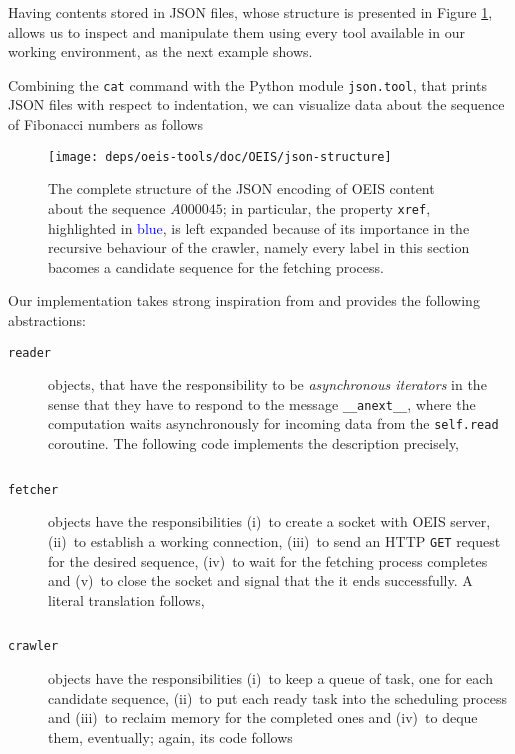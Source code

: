 Having contents stored in JSON files, whose structure is presented in Figure
\ref{fig:json-structure}, allows us to inspect and manipulate them using every
tool available in our working environment, as the next example shows.

\begin{example}
Combining the \verb|cat| command with the Python module \verb|json.tool|, that
prints JSON files with respect to indentation, we can visualize data about the
sequence of Fibonacci numbers as follows
\end{example}

\begin{figure}
\texttt{[image: deps/oeis-tools/doc/OEIS/json-structure]}
\caption{The complete structure of the JSON encoding of OEIS content about the
sequence $A000045$; in particular, the property \texttt{xref}, highlighted in
\textcolor{blue}{blue}, is left expanded because of its importance in the
recursive behaviour of the crawler, namely every label in this section bacomes
a candidate sequence for the fetching process.}
\label{fig:json-structure}
\end{figure}

Our implementation takes strong inspiration from
\citep{VANROSSUM:DAVIS:async:await} and provides the following abstractions:

\begin{description}

\item[\texttt{reader}] objects, that have the responsibility to be
\textit{asynchronous iterators} in the sense that they have to respond to the
message \verb|__anext__|, where the computation waits asynchronously for
incoming data from the \verb|self.read| coroutine. The following code
implements the description precisely,
\inputminted[stripnl=false,firstline=28,lastline=39,baselinestretch=0.8]
{python}{deps/oeis-tools/src/crawling.py} 

\item[\texttt{fetcher}] objects have the responsibilities (i)~to create a socket with
OEIS server, (ii)~to establish a working connection, (iii)~to send an HTTP \verb|GET|
request for the desired sequence, (iv)~to wait for the fetching process completes
and (v)~to close the socket and signal that the it ends successfully.
A literal translation follows,
\inputminted[stripnl=false,firstline=41,lastline=86,baselinestretch=0.8]
    {python}{deps/oeis-tools/src/crawling.py}

\item[\texttt{crawler}] objects have the responsibilities (i)~to keep a queue of task,
one for each candidate sequence, (ii)~to put each ready task into the
scheduling process and (iii)~to reclaim memory for the completed ones and
(iv)~to deque them, eventually; again, its code follows
\inputminted[stripnl=false,firstline=89,lastline=117,baselinestretch=0.8]
    {python}{deps/oeis-tools/src/crawling.py}

\end{description}

